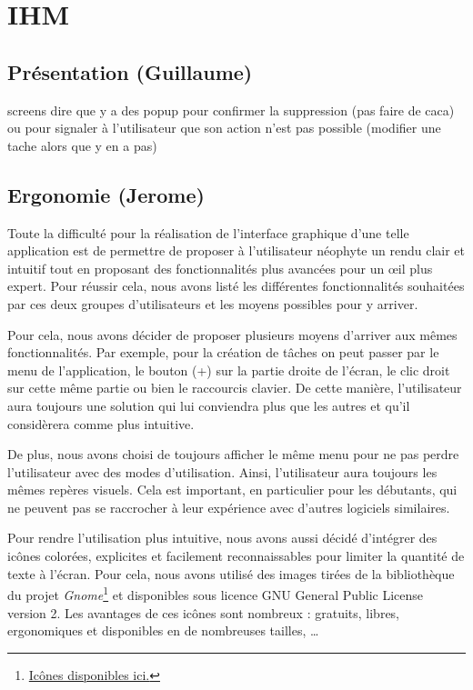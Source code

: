 \chapter{IHM}
	
	\section{Présentation (Guillaume)}
		screens
		dire que y a des popup pour confirmer la suppression (pas faire de caca) ou pour signaler à l'utilisateur que son action n'est pas possible (modifier une tache alors que y en a pas)
	
	\section{Ergonomie (Jerome)}
		Toute la difficulté pour la réalisation de l'interface graphique d'une telle application est de permettre de proposer à l'utilisateur néophyte un rendu clair et intuitif tout en proposant des fonctionnalités plus avancées pour un {\oe}il plus expert. Pour réussir cela, nous avons listé les différentes fonctionnalités souhaitées par ces deux groupes d'utilisateurs et les moyens possibles pour y arriver.
		
		Pour cela, nous avons décider de proposer plusieurs moyens d'arriver aux mêmes fonctionnalités. Par exemple, pour la création de tâches on peut passer par le menu de l'application, le bouton (+) sur la partie droite de l'écran, le clic droit sur cette même partie ou bien le raccourcis clavier. De cette manière, l'utilisateur aura toujours une solution qui lui conviendra plus que les autres et qu'il considèrera comme plus intuitive.
		
		De plus, nous avons choisi de toujours afficher le même menu pour ne pas perdre l'utilisateur avec des \og modes \fg d'utilisation. Ainsi, l'utilisateur aura toujours les mêmes repères visuels. Cela est important, en particulier pour les débutants, qui ne peuvent pas se raccrocher à leur expérience avec d'autres logiciels similaires.\newline
		
		Pour rendre l'utilisation plus intuitive, nous avons aussi décidé d'intégrer des icônes colorées, explicites et facilement reconnaissables pour limiter la quantité de texte à l'écran. Pour cela, nous avons utilisé des images tirées de la bibliothèque du projet \emph{Gnome}\footnote{\href{https://commons.wikimedia.org/wiki/GNOME_Desktop_icons}{Icônes disponibles ici.}} et disponibles sous licence GNU General Public License version 2. Les avantages de ces icônes sont nombreux : gratuits, libres, ergonomiques et disponibles en de nombreuses tailles, \dots \newline
		
